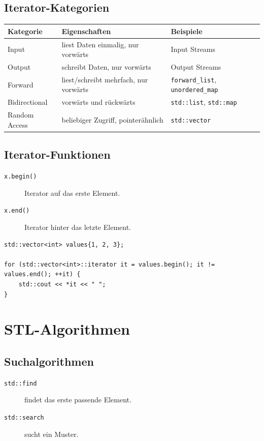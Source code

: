 \documentclass[11pt,a4paper]{article}
\newcommand{\code}[1]{\texttt{#1}}
\begin{document}
\subsection{Iterator-Kategorien}
\begin{center}
\begin{tabular}{lll}
\toprule
Kategorie & Eigenschaften & Beispiele \\
\midrule
Input & liest Daten einmalig, nur vorwärts & Input Streams \\
Output & schreibt Daten, nur vorwärts & Output Streams \\
Forward & liest/schreibt mehrfach, nur vorwärts & \code{forward\_list}, \code{unordered\_map} \\
Bidirectional & vorwärts und rückwärts & \code{std::list}, \code{std::map} \\
Random Access & beliebiger Zugriff, pointerähnlich & \code{std::vector} \\
\bottomrule
\end{tabular}
\end{center}

\subsection{Iterator-Funktionen}
\begin{description}
  \item[\code{x.begin()}] Iterator auf das erste Element.
  \item[\code{x.end()}] Iterator hinter das letzte Element.
\end{description}

\begin{lstlisting}[caption={Iterator-Beispiel}]
std::vector<int> values{1, 2, 3};

for (std::vector<int>::iterator it = values.begin(); it != values.end(); ++it) {
    std::cout << *it << " ";
}
\end{lstlisting}

\section{STL-Algorithmen}

\subsection{Suchalgorithmen}
\begin{description}
  \item[\code{std::find}] findet das erste passende Element.
  \item[\code{std::search}] sucht ein Muster.
\end{description}
\end{document}
